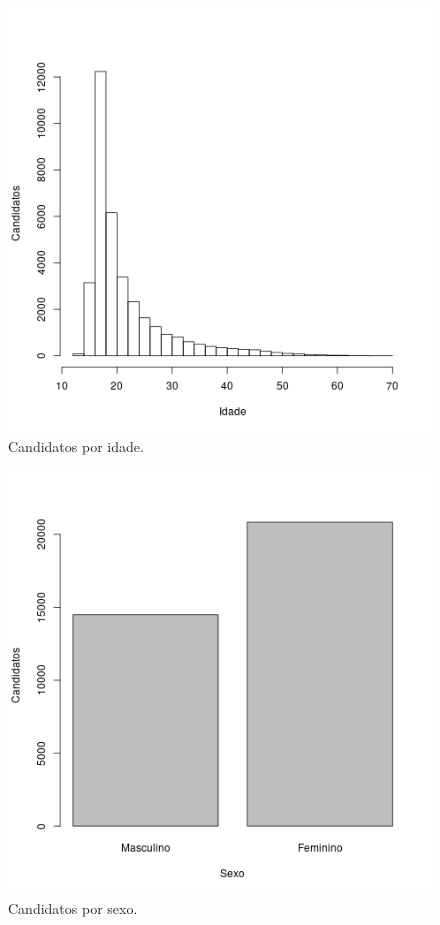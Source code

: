 \documentclass[12pt]{article}
\begin{document}
\begin{minipage}{.5\textwidth}
    \begin{figure}[H]
    \includegraphics[width=\linewidth]{../geral_candidatos-por-idade.png}
    \caption{Candidatos por idade.}
    \label{fig:candidatos-por-idade}
    \end{figure}
\end{minipage}%
\begin{minipage}{.5\textwidth}
    \begin{figure}[H]
    \includegraphics[width=\linewidth]{../geral_candidatos-por-sexo.png}
    \caption{Candidatos por sexo.}
    \label{fig:candidatos-por-sexo}
    \end{figure}
\end{minipage}
\end{document}
